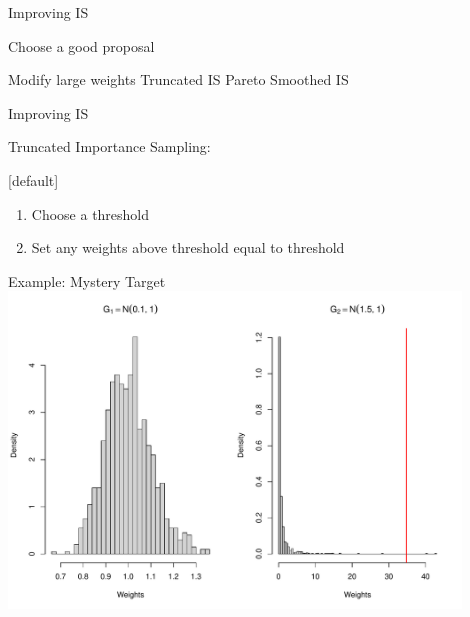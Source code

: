 \documentclass[14pt]{beamer}
\begin{document}


\begin{frame}{Improving IS}
    \begin{outline}
        \1 Choose a good proposal \newline
        
        \1 Modify large weights        
            \2 Truncated IS
            \2 Pareto Smoothed IS
    \end{outline}
\end{frame}

\begin{frame}{Improving IS}
    \begin{outline}
        \1 Truncated Importance Sampling:
            \2 \citep{Ion08} \newline
    \end{outline}

    [default]
    \begin{enumerate}
        \item Choose a threshold
        \item Set any weights above threshold equal to threshold
    \end{enumerate}
\end{frame}

\begin{frame}{Example: Mystery Target}
    \centering
    \includegraphics[height=0.9\textheight, width=0.9\textwidth, keepaspectratio]{Figures/Wt Hist - Thresh.pdf}
\end{frame}
\end{document}
